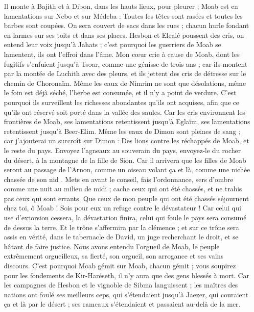 \begin{multicols}{2}
Il monte à Bajith et à Dibon, dans les hauts lieux, pour pleurer ; Moab est en lamentations sur Nebo et sur Médeba : Toutes les têtes sont rasées et toutes les barbes sont coupées.
On sera couvert de sacs dans les rues ; chacun hurle fondant en larmes sur ses toits et dans ses places.
Hesbon et Elealé poussent des cris, on entend leur voix jusqu'à Jahats ; c'est pourquoi les guerriers de Moab se lamentent, ils ont l'effroi dans l'âme.
Mon cœur crie à cause de Moab, dont les fugitifs s'enfuient jusqu'à Tsoar, comme une génisse de trois ans ; car ils montent par la montée de Luchith avec des pleurs, et ils jettent des cris de détresse sur le chemin de Choronaïm.
Même les eaux de Nimrim ne sont que désolations, même le foin est déjà séché, l'herbe est consumée, et il n'y a point de verdure.
C'est pourquoi ils surveillent les richesses abondantes qu'ils ont acquises, afin que ce qu'ils ont réservé soit porté dans la vallée des saules.
Car les cris environnent les frontières de Moab, ses lamentations retentissent jusqu'à Eglaïm, ses lamentations retentissent jusqu'à Beer-Elim.
Même les eaux de Dimon sont pleines de sang ; car j'ajouterai un surcroît sur Dimon : Des lions contre les réchappés de Moab, et le reste du pays.
\VerseOne{}Envoyez l'agneaux au souverain du pays, envoyez-le du rocher du désert, à la montagne de la fille de Sion.
Car il arrivera que les filles de Moab seront au passage de l'Arnon, comme un oiseau volant ça et là, comme une nichée chassée de son nid .
Mets en avant le conseil, fais l'ordonnance, sers d'ombre comme une nuit au milieu de midi ; cache ceux qui ont été chassés, et ne trahis pas ceux qui sont errants.
Que ceux de mon peuple qui ont été chassés séjournent chez toi, ô Moab ! Sois pour eux un refuge contre le dévastateur ! Car celui qui use d'extorsion cessera, la dévastation finira, celui qui foule le pays sera consumé de dessus la terre.
Et le trône s'affermira par la clémence ; et sur ce trône sera assis en vérité, dans le tabernacle de David, un juge recherchant le droit, et se hâtant de faire justice.
Nous avons entendu l'orgueil de Moab, le peuple extrêmement orgueilleux, sa fierté, son orgueil, son arrogance et ses vains discours.
C'est pourquoi Moab gémit sur Moab, chacun gémit ; vous soupirez pour les fondements de Kir-Haréseth, il n'y aura que des gens blessés à mort.
Car les campagnes de Hesbon et le vignoble de Sibma languissent ; les maîtres des nations ont foulé ses meilleurs ceps, qui s'étendaient jusqu'à Jaezer, qui couraient ça et là par le désert ; ses rameaux s'étendaient et passaient au-delà de la mer.

\end{multicols}
